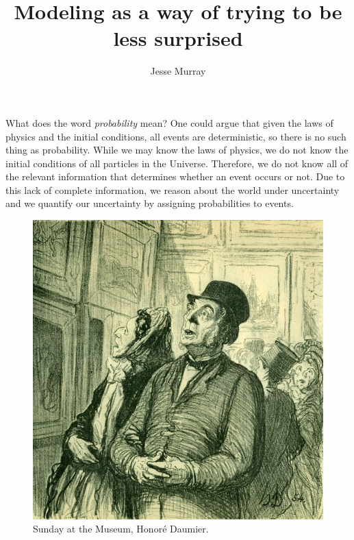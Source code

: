 \documentclass{article}
\title{Modeling as a way of trying to be \\less surprised}
\author{Jesse Murray}
\date{}
\begin{document}
\maketitle

What does the word \emph{probability} mean? One could argue that given the laws of physics and the initial conditions, all events are deterministic, so there is no such thing as probability. While we may know the laws of physics, we do not know the initial conditions of all particles in the Universe. Therefore, we do not know all of the relevant information that determines whether an event occurs or not. Due to this lack of complete information, we reason about the world under uncertainty and we quantify our uncertainty by assigning probabilities to events. 

\begin{figure}
    \centering
    \includegraphics[scale=1.4]{images/surprise_painting.jpg}
    \caption{Sunday at the Museum, Honoré Daumier.}
    \label{fig:surprise_painting}
\end{figure}
\end{document}
